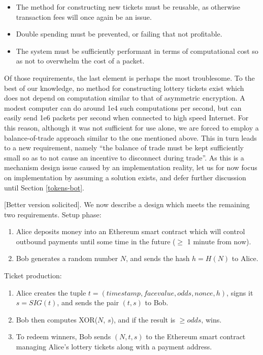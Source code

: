 \documentclass{article}
\begin{document}
\begin{itemize}
\item The method for constructing new tickets must be reusable, as otherwise transaction fees will once again be an issue.
\item Double spending must be prevented, or failing that not profitable.
\item The system must be sufficiently performant in terms of computational cost so as not to overwhelm the cost of a packet.
\end{itemize}

Of those requirements, the last element is perhaps the most troublesome. To the best of our knowledge, no method for constructing lottery tickets exist which does not depend on computation similar to that of asymmetric encryption. A modest computer can do around 1e4 such computations per second, but can easily send 1e6 packets per second when connected to high speed Internet. For this reason, although it was not sufficient for use alone, we are forced to employ a balance-of-trade approach similar to the one mentioned above. This in turn leads to a new requirement, namely ``the balance of trade must be kept sufficiently small so as to not cause an incentive to disconnect during trade''. As this is a mechanism design issue caused by an implementation reality, let us for now focus on implementation by assuming a solution exists, and defer further discussion until Section \ref{tokens-bot}.

[Better version solicited]. We now describe a design which meets the remaining two requirements. Setup phase:

\begin{enumerate}
\item Alice deposits money into an Ethereum smart contract which will control outbound payments until some time in the future ($\geq$ 1 minute from now).
\item Bob generates a random number $N$, and sends the hash $h=H(N)$ to Alice.
\end{enumerate}

Ticket production:

\begin{enumerate}
\item Alice creates the tuple $t = (timestamp, face value, odds, nonce, h)$, signs it $s = SIG(t)$, and sends the pair $(t, s)$ to Bob.
\item Bob then computes XOR($N$, $s$), and if the result is $\geq odds$, wins.
\item To redeem winners, Bob sends $(N, t, s)$ to the Ethereum smart contract managing Alice's lottery tickets along with a payment address.
\end{enumerate}
\end{document}
